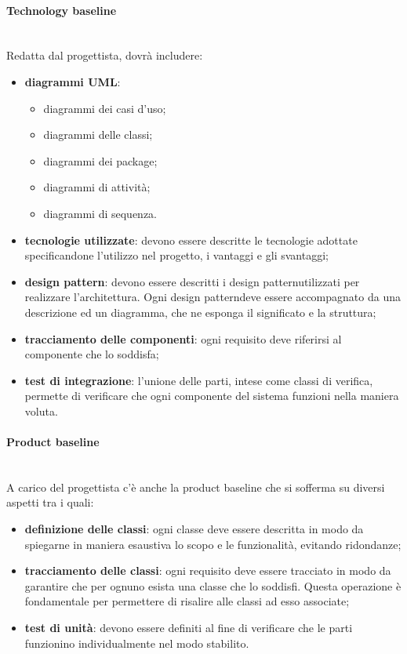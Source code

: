 \paragraph*{Technology baseline} \mbox{}\\

\noindent Redatta dal progettista, dovrà includere:
	\begin{itemize}
		\item \textbf{diagrammi UML\glo}:
		\begin{itemize}
			\item diagrammi dei casi d'uso;
			\item diagrammi delle classi;
			\item diagrammi dei package;
			\item diagrammi di attività;
			\item diagrammi di sequenza.
		\end{itemize}
		\item \textbf{tecnologie utilizzate}: devono essere descritte le tecnologie 
			adottate specificandone l'utilizzo nel progetto, i vantaggi e gli svantaggi;
		\item \textbf{design pattern\glo}: devono essere descritti i design 
			pattern\glosp utilizzati per realizzare l'architettura. Ogni design 
			pattern\glosp deve essere accompagnato da una descrizione ed un diagramma, che 
			ne esponga il significato e la struttura;
		\item \textbf{tracciamento delle componenti}: ogni requisito deve riferirsi 
			al componente che lo soddisfa;
		\item \textbf{test di integrazione}: l'unione delle parti, intese come 
			classi di verifica, permette di verificare che ogni componente del sistema 
			funzioni nella maniera voluta. \newline
	\end{itemize}
			
\paragraph*{Product baseline} \mbox{}\\

\noindent A carico del progettista c'è anche la product baseline che si sofferma su 
diversi aspetti tra i quali:
	\begin{itemize}
		\item \textbf{definizione delle classi}: ogni classe deve essere descritta 
			in modo da spiegarne in maniera esaustiva lo scopo e le funzionalità, evitando 
			ridondanze;
		\item \textbf{tracciamento delle classi}: ogni requisito deve essere 
			tracciato in modo da garantire che per ognuno esista una classe che lo soddisfi. 
			Questa operazione è fondamentale per permettere di risalire alle classi ad esso 
			associate;
		\item \textbf{test di unità}: devono essere definiti al fine di verificare 
			che le parti funzionino individualmente nel modo stabilito.
	\end{itemize}
		
